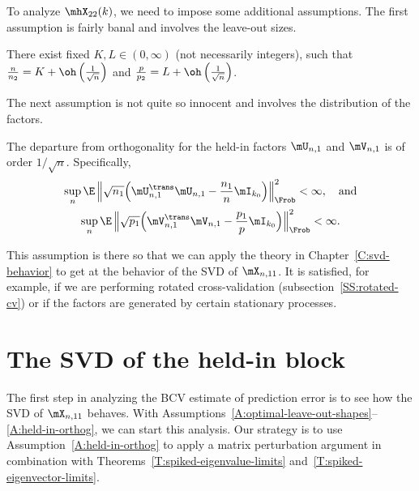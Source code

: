 To analyze $\mhX_{22}(k)$, we need to impose some additional assumptions.
The first assumption is fairly banal and involves the leave-out sizes.

\begin{assumption}
    There exist fixed $K, L \in (0, \infty)$ (not necessarily integers),
    such that
    $\frac{n}{n_2} = K + \oh\left(\frac{1}{\sqrt{n}}\right)$ and 
	$\frac{p}{p_2} = L + \oh\left(\frac{1}{\sqrt{n}}\right)$.
\end{assumption}

\noindent
The next assumption is not quite so innocent and involves the distribution of the factors.

\begin{assumption}\label{A:held-in-orthog}
    The departure from orthogonality for the held-in factors $\mU_{n,1}$
    and $\mV_{n,1}$ is of order $1/\sqrt{n}$.  Specifically,
    \begin{gather*}
        \sup_n 
        \E \, \Big\| 
            \sqrt{n_1} 
            \Big( 
                \mU_{n,1}^\trans \mU_{n,1} 
                -
                \frac{n_1}{n} \mI_{k_0}
            \Big)
        \Big\|_\Frob^2
        <
        \infty, \quad\text{and} \\
        \sup_n
        \E \, \Big\| 
            \sqrt{p_1} 
            \Big( 
                \mV_{n,1}^\trans \mV_{n,1} 
                -
                \frac{p_1}{p} \mI_{k_0}
            \Big)
        \Big\|_\Frob^2
        <
        \infty.
    \end{gather*}
\end{assumption}

\noindent
This assumption is there so that we can apply the theory in Chapter~\ref{C:svd-behavior} to get at the behavior of the SVD of $\mX_{n,11}$.  It is satisfied, for example, if we are performing rotated cross-validation (subsection~\ref{SS:rotated-cv}) or if the factors are generated by certain stationary processes.


\section{The SVD of the held-in block}

The first step in analyzing the BCV estimate of prediction error is to see how the SVD of $\mX_{n,11}$ behaves.  With Assumptions~\ref{A:optimal-leave-out-shapes}--\ref{A:held-in-orthog}, we can start this analysis.  Our strategy is to use Assumption~\ref{A:held-in-orthog} to apply a matrix perturbation argument in combination with Theorems~\ref{T:spiked-eigenvalue-limits} and~\ref{T:spiked-eigenvector-limits}.

